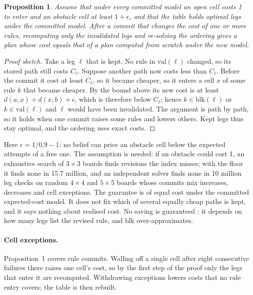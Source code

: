 \documentclass[letterpaper]{article}
\newtheorem{proposition}{Proposition}
\begin{document}
\begin{proposition}
Assume that under every committed model an open cell costs 1 to enter and an obstacle cell at least $1+\epsilon$, and that the table holds optimal legs under the committed model. After a commit that changes the cost of one or more rules, recomputing only the invalidated legs and re-solving the ordering gives a plan whose cost equals that of a plan computed from scratch under the new model.
\end{proposition}
\begin{proof}[Proof sketch]
Take a leg $\ell$ that is kept. No rule in $\mathrm{val}(\ell)$ changed, so its stored path still costs $C_\ell$. Suppose another path now costs less than $C_\ell$. Before the commit it cost at least $C_\ell$, so it became cheaper, so it enters a cell $x$ of some rule $k$ that became cheaper. By the bound above its new cost is at least $d(a,x)+d(x,b)+\epsilon$, which is therefore below $C_\ell$; hence $k \in \mathrm{blk}(\ell)$ or $k \in \mathrm{val}(\ell)$ and $\ell$ would have been invalidated. The argument is path by path, so it holds when one commit raises some rules and lowers others. Kept legs thus stay optimal, and the ordering uses exact costs.
\end{proof}
Here $\epsilon = 1/0.9 - 1$: no belief can price an obstacle cell below the expected attempts of a free one. The assumption is needed: if an obstacle could cost 1, an exhaustive search of $3\times3$ boards finds revisions the index misses; with the floor it finds none in 15.7 million, and an independent solver finds none in 10 million leg checks on random $4\times4$ and $5\times5$ boards whose commits mix increases, decreases and cell exceptions. The guarantee is of equal cost under the committed expected-cost model. It does not fix which of several equally cheap paths is kept, and it says nothing about realised cost. No saving is guaranteed \citep{nebel1995}: it depends on how many legs list the revised rule, and $\mathrm{blk}$ over-approximates.

\paragraph{Cell exceptions.} Proposition~1 covers rule commits. Walling off a single cell after eight consecutive failures there raises one cell's cost, so by the first step of the proof only the legs that enter it are recomputed. Withdrawing exceptions lowers costs that no rule entry covers; the table is then rebuilt.
\end{document}

